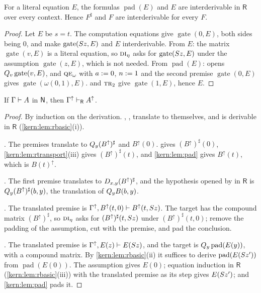 \begin{lemma}[Padding]
\label{kern:lem:pad}
For a literal equation $E$, the formulas $\operatorname{pad}(E)$ and $E$
are interderivable in $\mathsf{R}$ over every context.  Hence $F^{\sharp}$
and $F$ are interderivable for every $F$.
\end{lemma}

\begin{proof}
Let $E$ be $s=t$.  The computation equations give $\operatorname{gate}(0,E)$,
both sides being $0$, and make $\operatorname{gate}(S z,E)$ and $E$
interderivable.  From $E$: the matrix $\operatorname{gate}(v,E)$ is a
literal equation, so $\rulename{DI}_{\eta}$ asks for
$\operatorname{gate}(S z,E)$ under the assumption
$\operatorname{gate}(z,E)$, which is not needed.  From
$\operatorname{pad}(E)$:  opens
$Q_{v}\operatorname{gate}(v,E)$, and $\rulename{QE}_{\omega}$ with
$a\mathrel{:=} 0$, $n\mathrel{:=} 1$ and the second premise $\operatorname{gate}(0,E)$
gives $\operatorname{gate}(\omega(0,1),E)$.   and
$\rulename{Tr}_{2}$ give $\operatorname{gate}(1,E)$, hence $E$.
\end{proof}

\begin{theorem}[Embedding]
\label{kern:thm:rup}
If $\Gamma\vdash A$ in $\mathsf{N}$, then
$\Gamma^{\uparrow}\vdash_{\mathsf{R}}A^{\uparrow}$.
\end{theorem}

\begin{proof}
By induction on the derivation.  , ,
 translate to themselves, and  is derivable in
$\mathsf{R}$ (\cref{kern:lem:rbasic}(i)).

.  The premises translate to $Q_{y}(B^{\uparrow})^{\sharp}$ and
$B^{\uparrow}(0)$.   gives $(B^{\uparrow})^{\sharp}(0)$,
\cref{kern:lem:rtransport}(iii) gives $(B^{\uparrow})^{\sharp}(t)$, and
\cref{kern:lem:pad} gives $B^{\uparrow}(t)$, which is $B(t)^{\uparrow}$.

.  The first premise translates to
$D_{x,y}(B^{\uparrow})^{\sharp}$, and the hypothesis opened by
 in $\mathsf{R}$ is $Q_{y}(B^{\uparrow})^{\sharp}(b,y)$, the
translation of $Q_{y}B(b,y)$.

.  The translated premise is
$\Gamma^{\uparrow},B^{\uparrow}(t,0)\vdash B^{\uparrow}(t,S z)$.  The
target has the compound matrix $(B^{\uparrow})^{\sharp}$, so
$\rulename{DI}_{\eta}$ asks for $(B^{\uparrow})^{\sharp}(t,S z)$ under
$(B^{\uparrow})^{\sharp}(t,0)$; remove the padding of the assumption, cut
with the premise, and pad the conclusion.

.  The translated premise is
$\Gamma^{\uparrow},E(z)\vdash E(S z)$, and the target is
$Q_{y}\operatorname{pad}(E(y))$, with a compound matrix.  By
\cref{kern:lem:rbasic}(ii) it suffices to derive
$\operatorname{pad}(E(S z'))$ from $\operatorname{pad}(E(0))$.  The
assumption gives $E(0)$; equation induction in $\mathsf{R}$
(\cref{kern:lem:rbasic}(iii)) with the translated premise as its step gives
$E(S z')$; and \cref{kern:lem:pad} pads it.
\end{proof}

